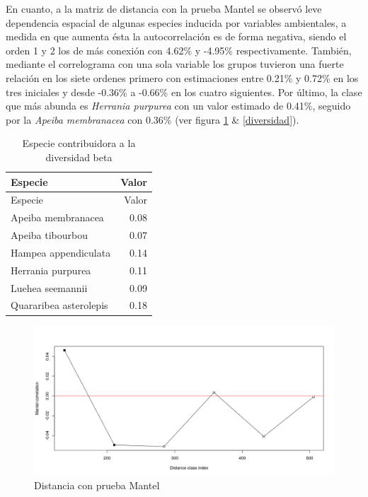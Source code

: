 \documentclass[11pt,]{article}
\begin{document}
En cuanto, a la matriz de distancia con la prueba Mantel se observó leve
dependencia espacial de algunas especies inducida por variables
ambientales, a medida en que aumenta ésta la autocorrelación es de forma
negativa, siendo el orden 1 y 2 los de más conexión con 4.62\% y -4.95\%
respectivamente. También, mediante el correlograma con una sola variable
los grupos tuvieron una fuerte relación en los siete ordenes primero con
estimaciones entre 0.21\% y 0.72\% en los tres iniciales y desde -0.36\%
a -0.66\% en los cuatro siguientes. Por último, la clase que más abunda
es \emph{Herrania purpurea} con un valor estimado de 0.41\%, seguido por
la \emph{Apeiba membranacea} con 0.36\% (ver figura \ref{distancia} \&
\ref{diversidad}).

\begin{longtable}[]{@{}lr@{}}
\caption{Especie contribuidora a la diversidad
beta\label{beta}}\tabularnewline
\toprule
Especie & Valor\tabularnewline
\midrule
\endfirsthead
\toprule
Especie & Valor\tabularnewline
\midrule
\endhead
Apeiba membranacea & 0.08\tabularnewline
Apeiba tibourbou & 0.07\tabularnewline
Hampea appendiculata & 0.14\tabularnewline
Herrania purpurea & 0.11\tabularnewline
Luehea seemannii & 0.09\tabularnewline
Quararibea asterolepis & 0.18\tabularnewline
\bottomrule
\end{longtable}

\begin{figure}
\centering
\includegraphics[width=1.00000\textwidth]{ecologia_espacial_files/figure-markdown_github/unnamed-chunk-14-1.png}
\caption{Distancia con prueba Mantel\label{distancia}}
\end{figure}
\end{document}
